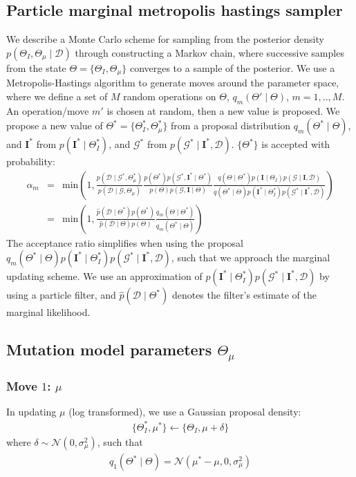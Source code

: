 \documentclass[a4paper,18pt]{report}
\begin{document}
\subsection{Particle marginal metropolis hastings sampler}
We describe a Monte Carlo scheme for sampling from the posterior density $p(\Theta_I, \Theta_{\mu} \mid \mathcal{D})$ through constructing a Markov chain, where successive samples from the state $\Theta=\{\Theta_{I}, \Theta_{\mu}\}$ converges to a sample of the posterior. We use a Metropolis-Hastings algorithm to generate moves around the parameter space, where we define a set of $M$ random operations on $\Theta$, $q_m(\Theta'\mid \Theta)$, $m=1,..,M$. An operation/move $m'$ is chosen at random, then a new value is proposed.
We propose a new value of $\Theta^*=\{\Theta_{I}^*, \Theta_{\mu}^* \}$ from a proposal distribution  $q_m(\Theta^*\mid \Theta)$, and $\mathbf{I}^*$ from  $p(\mathbf{I}^* \mid \Theta_I^*)$, and $\mathcal{G}^*$ from $p(\mathcal{G}^* \mid \mathbf{I}^*, \mathcal{D})$. $\{\Theta^*\}$ is accepted with probability:
\begin{eqnarray}
\alpha_m&=&\textrm{min}\left(1,\frac{p(\mathcal{D}\mid \mathcal{G}^*, \Theta_{\mu}^*)}{p(\mathcal{D}\mid \mathcal{G}, \Theta_{\mu})} \frac{p(\Theta^*)p(\mathcal{G}^*,\mathbf{I}^*\mid\Theta^*)}{p(\Theta)p(\mathcal{G},\mathbf{I}\mid\Theta)}\frac{q(\Theta\mid\Theta^*)p(\mathbf{I}\mid \Theta_I)p(\mathcal{G} \mid \mathbf{I}, \mathcal{D})}{q(\Theta^*\mid\Theta)p(\mathbf{I}^* \mid \Theta_I^*)p(\mathcal{G}^* \mid \mathbf{I}^*, \mathcal{D})}\right)\\
&=&\textrm{min}\left(1,\frac{\hat{p}(\mathcal{D}\mid \Theta^*)p(\Theta^*)}{\hat{p}(\mathcal{D}\mid \Theta)p(\Theta)} \frac{q_m(\Theta\mid\Theta^*)}{q_m(\Theta^*\mid\Theta)}\right)
\end{eqnarray}
The acceptance ratio simplifies when using the proposal $q_m(\Theta^*\mid\Theta)p(\mathbf{I}^* \mid \Theta_I^*)p(\mathcal{G}^* \mid \mathbf{I}^*, \mathcal{D})$, such that we approach the marginal updating scheme. We use an approximation of $p(\mathbf{I}^* \mid \Theta_I^*)p(\mathcal{G}^* \mid \mathbf{I}^*, \mathcal{D})$ by using a particle filter, and $\hat{p}(\mathcal{D}\mid \Theta^*)$ denotes the filter's estimate of the marginal likelihood.
\subsection{Mutation model parameters $\Theta_{\mu}$} 
\subsubsection{Move $1$: $\mu$}
In updating $\mu$ (log transformed), we use a Gaussian proposal density:
\begin{eqnarray}
\{\Theta_I^*, \mu^*\}\leftarrow\{\Theta_I, \mu+\delta\}
\end{eqnarray}
where $\delta\sim\mathcal{N}(0,\sigma_{\mu}^2)$, such that 
\begin{eqnarray}
q_1(\Theta^*\mid\Theta) = \mathcal{N}(\mu^*-\mu,0,\sigma_{\mu}^2)
\end{eqnarray}
\end{document}

